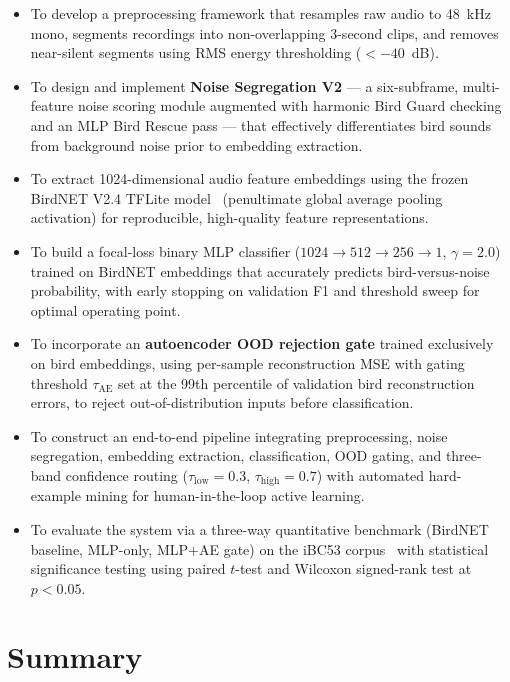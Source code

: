 \documentclass[a4paper,12pt]{article}
\begin{document}
\begin{itemize}
    \item To develop a preprocessing framework that resamples raw audio to 48~kHz mono, segments
          recordings into non-overlapping 3-second clips, and removes near-silent segments using
          RMS energy thresholding ($< -40$~dB).
    \item To design and implement \textbf{Noise Segregation V2} --- a six-subframe, multi-feature
          noise scoring module augmented with harmonic Bird Guard checking and an MLP Bird Rescue
          pass --- that effectively differentiates bird sounds from background noise prior to
          embedding extraction.
    \item To extract 1024-dimensional audio feature embeddings using the frozen BirdNET V2.4
          TFLite model~\cite{BirdNET} (penultimate global average pooling activation) for reproducible,
          high-quality feature representations.
    \item To build a focal-loss binary MLP classifier ($1024 \to 512 \to 256 \to 1$, $\gamma = 2.0$)
          trained on BirdNET embeddings that accurately predicts bird-versus-noise probability,
          with early stopping on validation F1 and threshold sweep for optimal operating point.
    \item To incorporate an \textbf{autoencoder OOD rejection gate} trained exclusively on
          bird embeddings, using per-sample reconstruction MSE with gating threshold
          $\tau_{\mathrm{AE}}$ set at the 99th percentile of validation bird reconstruction
          errors, to reject out-of-distribution inputs before classification.
    \item To construct an end-to-end pipeline integrating preprocessing, noise segregation,
          embedding extraction, classification, OOD gating, and three-band confidence routing
          ($\tau_{\mathrm{low}} = 0.3$, $\tau_{\mathrm{high}} = 0.7$) with automated
          hard-example mining for human-in-the-loop active learning.
    \item To evaluate the system via a three-way quantitative benchmark (BirdNET baseline,
          MLP-only, MLP$+$AE gate) on the iBC53 corpus~\cite{iBC53} with statistical significance
          testing using paired $t$-test and Wilcoxon signed-rank test at $p < 0.05$.
\end{itemize}

\section{Summary}
\end{document}
